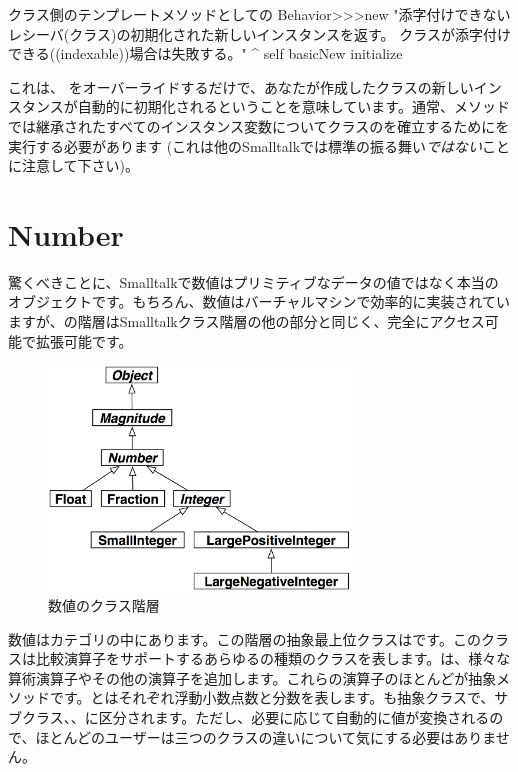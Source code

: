 \documentclass[a4paper,10pt,twoside]{book}
\begin{document}
\begin{method}{クラス側のテンプレートメソッドとしての}
Behavior>>>new
    "添字付けできないレシーバ(クラス)の初期化された新しいインスタンスを返す。
    クラスが添字付けできる((indexable))場合は失敗する。"
    ^ self basicNew initialize
\end{method}

これは、 をオーバーライドするだけで、あなたが作成したクラスの新しいインスタンスが自動的に初期化されるということを意味しています。通常、メソッドでは継承されたすべてのインスタンス変数についてクラスのを確立するためにを実行する必要があります
(これは他のSmalltalkでは標準の振る舞い\emph{ではない}ことに注意して下さい)。

\section{Number}
驚くべきことに、Smalltalkで数値はプリミティブなデータの値ではなく本当のオブジェクトです。もちろん、数値はバーチャルマシンで効率的に実装されていますが、の階層はSmalltalkクラス階層の他の部分と同じく、完全にアクセス可能で拡張可能です。

\begin{figure}[ht]
\centerline {\includegraphics[width=8cm]{NumberHierarchy}}
\caption{数値のクラス階層 }
\end{figure}

数値はカテゴリの中にあります。この階層の抽象最上位クラスはです。このクラスは比較演算子をサポートするあらゆるの種類のクラスを表します。は、様々な算術演算子やその他の演算子を追加します。これらの演算子のほとんどが抽象メソッドです。とはそれぞれ浮動小数点数と分数を表します。も抽象クラスで、サブクラス、、に区分されます。ただし、必要に応じて自動的に値が変換されるので、ほとんどのユーザーは三つのクラスの違いについて気にする必要はありません。
\end{document}
